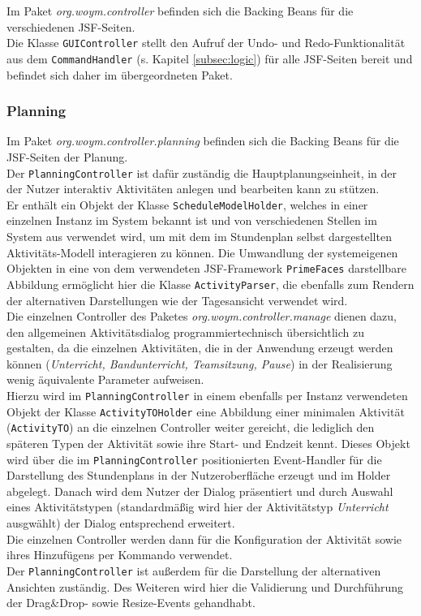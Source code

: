\documentclass[fontsize=12pt,paper=a4,twoside]{scrartcl}
\begin{document}
Im Paket \textit{org.woym.controller} befinden sich die Backing Beans für die verschiedenen JSF-Seiten. \\
Die Klasse \texttt{GUIController} stellt den Aufruf der Undo- und Redo-Funktionalität aus dem \texttt{CommandHandler} (s. Kapitel \ref{subsec:logic}) für alle JSF-Seiten bereit und befindet sich daher im übergeordneten Paket.\\

\subsubsection{Planning}
Im Paket \textit{org.woym.controller.planning} befinden sich die Backing Beans für die JSF-Seiten der Planung.\\ 
Der \texttt{PlanningController} ist dafür zuständig die Hauptplanungseinheit, in der der Nutzer interaktiv Aktivitäten anlegen und bearbeiten kann zu stützen.\\
Er enthält ein Objekt der Klasse \texttt{ScheduleModelHolder}, welches in einer einzelnen Instanz im System bekannt ist und von verschiedenen Stellen im System aus verwendet wird, um mit dem im Stundenplan selbst dargestellten Aktivitäts-Modell interagieren zu können. Die Umwandlung der systemeigenen Objekten in eine von dem verwendeten JSF-Framework \texttt{PrimeFaces} darstellbare Abbildung ermöglicht hier die Klasse \texttt{ActivityParser}, die ebenfalls zum Rendern der alternativen Darstellungen wie der Tagesansicht verwendet wird.\\
Die einzelnen Controller des Paketes \textit{org.woym.controller.manage} dienen dazu, den allgemeinen Aktivitätsdialog programmiertechnisch übersichtlich zu gestalten, da die einzelnen Aktivitäten, die in der Anwendung erzeugt werden können (\textit{Unterricht, Bandunterricht, Teamsitzung, Pause}) in der Realisierung wenig äquivalente Parameter aufweisen.\\
Hierzu wird im \texttt{PlanningController} in einem ebenfalls per Instanz verwendeten Objekt der Klasse \texttt{ActivityTOHolder} eine Abbildung einer minimalen Aktivität (\texttt{ActivityTO}) an die einzelnen Controller weiter gereicht, die lediglich den späteren Typen der Aktivität sowie ihre Start- und Endzeit kennt. Dieses Objekt wird über die im \texttt{PlanningController} positionierten Event-Handler für die Darstellung des Stundenplans in der Nutzeroberfläche erzeugt und im Holder abgelegt. Danach wird dem Nutzer der Dialog präsentiert und durch Auswahl eines Aktivitätstypen (standardmäßig wird hier der Aktivitätstyp \textit{Unterricht} ausgwählt) der Dialog entsprechend erweitert.\\
Die einzelnen Controller werden dann für die Konfiguration der Aktivität sowie ihres Hinzufügens per Kommando verwendet.\\
Der \texttt{PlanningController} ist außerdem für die Darstellung der alternativen Ansichten zuständig. Des Weiteren wird hier die Validierung und Durchführung der Drag\&Drop- sowie Resize-Events gehandhabt.\\
\end{document}
